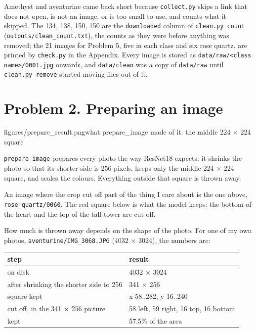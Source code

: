 \documentclass[11pt]{article}
\begin{document}
Amethyst and aventurine came back short because \texttt{collect.py} skips a link
that does not open, is not an image, or is too small to use, and counts what it
skipped. The 134, 138, 150, 150 are the \texttt{downloaded} column of
\texttt{clean.py count} (\texttt{outputs/clean\_count.txt}), the counts as they
were before anything was removed; the 21 images for Problem 5, five in each class
and six rose quartz, are printed by \texttt{check.py} in the Appendix. Every
image is stored as \texttt{data/raw/<class name>/0001.jpg} onwards, and
\texttt{data/clean} was a copy of \texttt{data/raw} until \texttt{clean.py
remove} started moving files out of it.

\section*{Problem 2. Preparing an image}

           {figures/prepare_result.png}{what prepare\_image made of it: the middle
            224 \(\times\) 224 square}

\texttt{prepare\_image} prepares every photo the way ResNet18 expects: it shrinks
the photo so that its shorter side is 256 pixels, keeps only the middle
224 \(\times\) 224 square, and scales the colours. Everything outside that square
is thrown away.

An image where the crop cut off part of the thing I care about is the one above,
\texttt{rose\_quartz/0060}. The red square below is what the model keeps: the
bottom of the heart and the top of the tall tower are cut off.

\begin{center}\end{center}

How much is thrown away depends on the shape of the photo. For one of my own
photos, \texttt{aventurine/IMG\_3068.JPG} (4032 \(\times\) 3024), the numbers are:

\begin{center}\footnotesize
\begin{tabular}{ll}
\toprule
step & result \\
\midrule
on disk & 4032 \(\times\) 3024 \\
after shrinking the shorter side to 256 & 341 \(\times\) 256 \\
square kept & x 58..282, y 16..240 \\
cut off, in the 341 \(\times\) 256 picture & 58 left, 59 right, 16 top, 16 bottom \\
kept & 57.5\% of the area \\
\bottomrule
\end{tabular}
\end{center}
\end{document}
